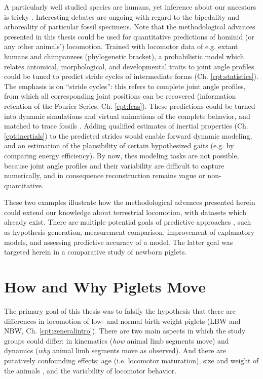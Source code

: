 A particularly well studied species are humans, yet inference about our ancestors is tricky \citep{Polk2004,Cazenave2023,Stamos2023}.
Interesting debates are ongoing with regard to the bipedality and arboreality of particular fossil specimens.
Note that the methodological advances presented in this thesis could be used for quantitative predictions of hominid (or any other animals') locomotion.
Trained with locomotor data of e.g. extant humans and chimpanzees (phylogenetic bracket), a probabilistic model which relates antomical, morphological, and developmental traits to joint angle profiles could be tuned to predict stride cycles of intermediate forms (Ch. \ref{cpt:statistics}).
The emphasis is on ``stride cycles'': this refers to complete joint angle profiles, from which all corresponding joint positions can be recovered (information retention of the Fourier Series, Ch. \ref{cpt:fcas}).
These predictions could be turned into dynamic simulations and virtual animations of the complete behavior, and matched to trace fossils \citep[as in][but with less manual work]{Nyakatura2019}.
Adding qualified estimates of inertial properties (Ch. \ref{cpt:inertials}) to the predicted strides would enable forward dynamic modeling, and an estimation of the plausibility of certain hypothesized gaits (e.g. by comparing energy efficiency).
By now, thes modeling tasks are not possible, because joint angle profiles and their variability are difficult to capture numerically, and in consequence reconstruction remains vague or non-quantitative.


These two examples illustrate how the methodological advances presented herein could extend our knowledge about terrestrial locomotion, with datasets which already exist.
There are multiple potential goals of predictive approaches \citep{Shmueli2010}, such as hypothesis generation, measurement comparison, improvement of explanatory models, and assessing predictive accuracy of a model.
The latter goal was targeted herein in a comparative study of newborn piglets.


\section{How and Why Piglets Move}
\label{sec:org3dece3a}
The primary goal of this thesis was to falsify the hypothesis that there are differences in locomotion of low- and normal birth weight piglets (LBW and NBW, Ch. \ref{cpt:generalintro}).
There are two main aspects in which the study groups could differ: in kinematics (\emph{how} animal limb segments move) and dynamics (\emph{why} animal limb segments move as observed).
And there are putatively confounding effects: age (i.e. locomotor maturation), size and weight of the animals \citep[i.e. physical appearance, cf.][]{Aerts2023}, and the variability of locomotor behavior.


